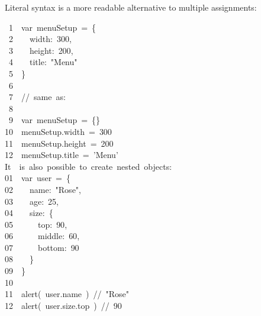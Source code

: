 \documentclass{article}
\begin{document}
Literal syntax is a more readable alternative to multiple assignments:%
\begin{mdpre}%
\noindent~{1}~~{var}~menuSetup~=~\{\\
~{2}~~~~width:~{300},\\
~{3}~~~~height:~{200},\\
~{4}~~~~title:~{"}{Menu}{"}\\
~{5}~~\}\\
~{6}\\
~{7}~~{//~same~as:}\\
~{8}\\
~{9}~~{var}~menuSetup~=~\{\}\\
{10}~~menuSetup.width~=~{300}\\
{11}~~menuSetup.height~=~{200}\\
{12}~~menuSetup.title~=~{'}{Menu}{'}\\
It~~is~also~possible~to~create~nested~objects:\\
{01}~~{var}~user~=~\{\\
{02}~~~~name:~{"}{Rose}{"},\\
{03}~~~~age:~{25},\\
{04}~~~~size:~\{\\
{05}~~~~~~top:~{90},\\
{06}~~~~~~middle:~{60},\\
{07}~~~~~~bottom:~{90}\\
{08}~~~~\}\\
{09}~~\}\\
{10}\\
{11}~~alert(~user.name~)~{//~"Rose"}\\
{12}~~alert(~user.size.top~)~{//~90}%
\end{mdpre}
\end{document}
